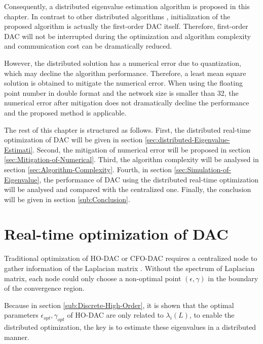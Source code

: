 Consequently, a distributed eigenvalue estimation algorithm is proposed
in this chapter. In contrast to other distributed algorithms \cite{Kempe2008}\cite{Franceschelli2009}\cite{Yang2010},
initialization of the proposed algorithm is actually the first-order
DAC itself. Therefore, first-order DAC will not be interrupted during
the optimization and algorithm complexity and communication cost can
be dramatically reduced.  

However, the distributed solution has a numerical error due to quantization,
which may decline the algorithm performance. Therefore, a least mean
square solution is obtained to mitigate the numerical error. When
using the floating point number in double format and the network size
is smaller than 32, the numerical error after mitigation does not
dramatically decline the performance and the proposed method is applicable. 





The rest of this chapter is structured as follows. First,  the distributed
real-time optimization of DAC will be given in section \ref{sec:distributed-Eigenvalue-Estimati}.
Second, the mitigation of numerical error  will be proposed in section
\ref{sec:Mitigation-of-Numerical}. Third, the algorithm complexity
will be analysed in section \ref{sec:Algorithm-Complexity}. Fourth,
in section \ref{sec:Simulation-of-Eigenvalue}, the performance of
DAC using the distributed real-time optimization  will be  analysed
and compared with the centralized one. Finally, the conclusion will
be given in section \ref{sub:Conclusion}.


\section{\label{sec:distributed-Eigenvalue-Estimati}Real-time optimization
of DAC }

Traditional optimization of HO-DAC or CFO-DAC requires a centralized
node to gather information of the Laplacian matrix \cite{Xiong2010}.
Without the spectrum of Laplacian matrix, each node could only choose
a non-optimal point $\left(\epsilon,\gamma\right)$ in the boundary
of  the convergence region.

Because in section \ref{sub:Discrete-High-Order}, it is shown that
the optimal parameters $\epsilon_{opt},\gamma_{opt}$ of HO-DAC are
only related to $\lambda_{i}\left(L\right)$, to enable the distributed
optimization, the key is to estimate these eigenvalues in a distributed
manner.  

